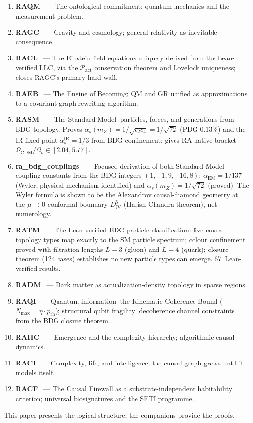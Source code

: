 \documentclass[11pt,a4paper]{article}
\begin{document}
\begin{enumerate}[noitemsep,label=\arabic*.,leftmargin=*]
  \item \textbf{RAQM}~\citep{Sandeman2026RAQM} --- The ontological commitment;
  quantum mechanics and the measurement problem.
  \item \textbf{RAGC}~\citep{Sandeman2026RAGC} --- Gravity and cosmology;
  general relativity as inevitable consequence.
  \item \textbf{RACL}~\citep{Sandeman2026RACL} --- The Einstein field
  equations uniquely derived from the Lean-verified LLC, via the
  $\mathcal{P}_{\mathrm{act}}$ conservation theorem and Lovelock uniqueness;
  closes RAGC's primary hard wall.
  \item \textbf{RAEB}~\citep{Sandeman2026RAEB} --- The Engine of Becoming;
  QM and GR unified as approximations to a covariant graph rewriting algorithm.
  \item \textbf{RASM}~\citep{Sandeman2026RASM} --- The Standard Model;
  particles, forces, and generations from BDG topology. Proves
  $\alpha_s(m_Z) = 1/\sqrt{c_2 c_4} = 1/\sqrt{72}$ (PDG $0.13\%$) and the
  IR fixed point $\alpha_s^{\mathrm{IR}} = 1/3$ from BDG confinement;
  gives RA-native bracket $\Omega_{\mathrm{CDM}}/\Omega_b \in [2.04, 5.77]$.
  \item \textbf{ra\_bdg\_couplings}~\citep{Sandeman2026BDG} --- Focused
  derivation of both Standard Model coupling constants from the BDG integers
  $(1,-1,9,-16,8)$: $\alpha_{\mathrm{EM}} = 1/137$ (Wyler; physical mechanism
  identified) and $\alpha_s(m_Z) = 1/\sqrt{72}$ (proved). The Wyler formula
  is shown to be the Alexandrov causal-diamond geometry at the $\mu\to 0$
  conformal boundary $D_{\mathrm{IV}}^5$ (Harish-Chandra theorem), not numerology.
  \item \textbf{RATM}~\citep{Sandeman2026RATM} --- The Lean-verified BDG
  particle classification: five causal topology types map exactly to the SM
  particle spectrum; colour confinement proved with filtration lengths $L=3$
  (gluon) and $L=4$ (quark); closure theorem (124 cases) establishes no new
  particle types can emerge. 67~Lean-verified results.
  \item \textbf{RADM}~\citep{Sandeman2026RADM} --- Dark matter as
  actualization-density topology in sparse regions.
  \item \textbf{RAQI}~\citep{Sandeman2026RAQI} --- Quantum information;
  the Kinematic Coherence Bound ($N_{\max} = \eta \cdot p_{\mathrm{th}}$);
  structural qubit fragility; decoherence channel constraints from the BDG
  closure theorem.
  \item \textbf{RAHC}~\citep{Sandeman2026RAHC} --- Emergence and the
  complexity hierarchy; algorithmic causal dynamics.
  \item \textbf{RACI}~\citep{Sandeman2026RACI} --- Complexity, life,
  and intelligence; the causal graph grows until it models itself.
  \item \textbf{RACF}~\citep{Sandeman2026RACF} --- The Causal Firewall
  as a substrate-independent habitability criterion; universal
  biosignatures and the SETI programme.
\end{enumerate}
This paper presents the logical structure; the companions provide the proofs.
\end{document}
